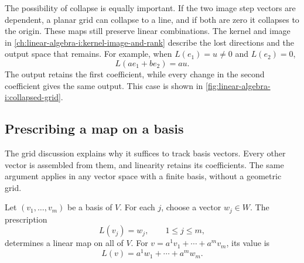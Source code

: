 The possibility of collapse is equally important. If the two image step
vectors are dependent, a planar grid can collapse to a line, and if both
are zero it collapses to the origin. These maps still preserve linear
combinations. The kernel and image in
\autoref{ch:linear-algebra-i:kernel-image-and-rank} describe the lost
directions and the output space that remains.
For example, when \(L(e_1)=u\ne0\) and \(L(e_2)=0\),
\[
  L(ae_1+be_2)=au.
\]
The output retains the first coefficient, while every change in the
second coefficient gives the same output. This case is shown in
\autoref{fig:linear-algebra-i:collapsed-grid}.
\begin{marginfigure}
  \centering
  
  \caption[A grid can collapse]{Schematic with \(L(e_1)=u\ne0\) and
    \(L(e_2)=0\). Each vertical input line collapses to one point.
    Equal horizontal steps still give equal steps along the image line.}
  \label{fig:linear-algebra-i:collapsed-grid}
\end{marginfigure}

\subsection{Prescribing a map on a basis}

The grid discussion explains why it suffices to track basis vectors.
Every other vector is assembled from them, and linearity retains its
coefficients. The same argument applies in any vector space with a finite
basis, without a geometric grid.

Let \((v_1,\ldots,v_m)\) be a basis of \(V\). For each \(j\), choose
a vector \(w_j\in W\). The prescription
\[
  L(v_j)=w_j,\qquad 1\leq j\leq m,
\]
determines a linear map on all of \(V\). For
\(v=a^1v_1+\cdots+a^mv_m\), its value is
\[
  L(v)=a^1w_1+\cdots+a^mw_m.
\]

